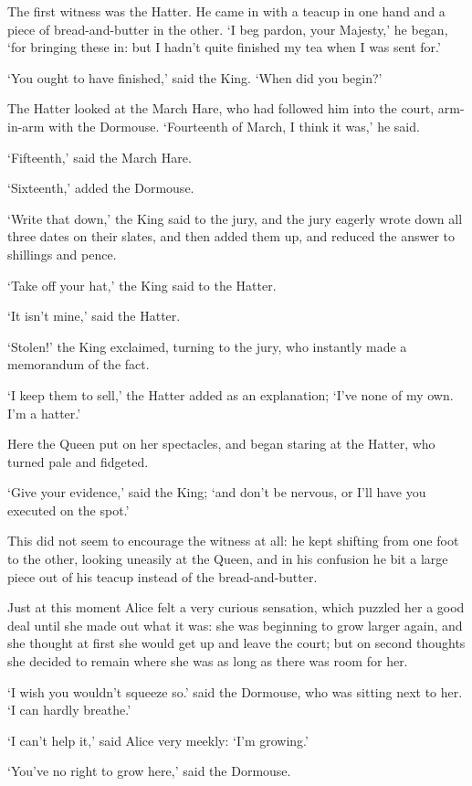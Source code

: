 \documentclass[12pt]{book}
\begin{document}
  The first witness was the Hatter.  He came in with a teacup in
one hand and a piece of bread-and-butter in the other.  `I beg
pardon, your Majesty,' he began, `for bringing these in:  but I
hadn't quite finished my tea when I was sent for.'

  `You ought to have finished,' said the King.  `When did you
begin?'

  The Hatter looked at the March Hare, who had followed him into
the court, arm-in-arm with the Dormouse.  `Fourteenth of March, I
think it was,' he said.

  `Fifteenth,' said the March Hare.

  `Sixteenth,' added the Dormouse.

  `Write that down,' the King said to the jury, and the jury
eagerly wrote down all three dates on their slates, and then
added them up, and reduced the answer to shillings and pence.

  `Take off your hat,' the King said to the Hatter.

  `It isn't mine,' said the Hatter.

  `Stolen!' the King exclaimed, turning to the jury, who
instantly made a memorandum of the fact.

  `I keep them to sell,' the Hatter added as an explanation;
`I've none of my own.  I'm a hatter.'

  Here the Queen put on her spectacles, and began staring at the
Hatter, who turned pale and fidgeted.

  `Give your evidence,' said the King; `and don't be nervous, or
I'll have you executed on the spot.'

  This did not seem to encourage the witness at all:  he kept
shifting from one foot to the other, looking uneasily at the
Queen, and in his confusion he bit a large piece out of his
teacup instead of the bread-and-butter.

  Just at this moment Alice felt a very curious sensation, which
puzzled her a good deal until she made out what it was:  she was
beginning to grow larger again, and she thought at first she
would get up and leave the court; but on second thoughts she
decided to remain where she was as long as there was room for
her.

  `I wish you wouldn't squeeze so.' said the Dormouse, who was
sitting next to her.  `I can hardly breathe.'

  `I can't help it,' said Alice very meekly:  `I'm growing.'

  `You've no right to grow here,' said the Dormouse.
\end{document}
